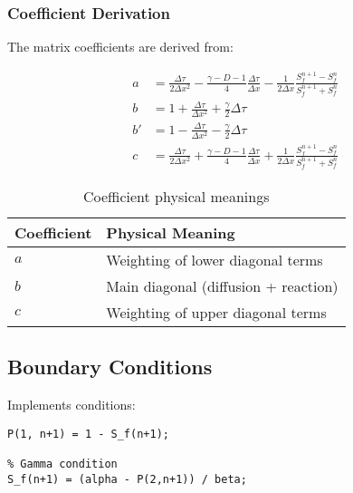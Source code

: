 \documentclass[12pt]{article}
\begin{document}
\subsubsection{Coefficient Derivation}
The matrix coefficients are derived from:

\begin{align*}
a &= \frac{\Delta\tau}{2\Delta x^2} - \frac{\gamma - D - 1}{4}\frac{\Delta\tau}{\Delta x} - \frac{1}{2\Delta x}\frac{S_f^{n+1} - S_f^n}{S_f^{n+1} + S_f^n} \\
b &= 1 + \frac{\Delta\tau}{\Delta x^2} + \frac{\gamma}{2}\Delta\tau \\
b' &= 1 - \frac{\Delta\tau}{\Delta x^2} - \frac{\gamma}{2}\Delta\tau \\
c &= \frac{\Delta\tau}{2\Delta x^2} + \frac{\gamma - D - 1}{4}\frac{\Delta\tau}{\Delta x} + \frac{1}{2\Delta x}\frac{S_f^{n+1} - S_f^n}{S_f^{n+1} + S_f^n}
\end{align*}

\begin{table}[h]
\centering
\caption{Coefficient physical meanings}
\begin{tabular}{ll}
\hline
Coefficient & Physical Meaning \\ \hline
$a$ & Weighting of lower diagonal terms \\
$b$ & Main diagonal (diffusion + reaction) \\
$c$ & Weighting of upper diagonal terms \\ \hline
\end{tabular}
\end{table}

\subsection{Boundary Conditions}
Implements conditions:
\begin{lstlisting}[caption={Boundary condition implementation}]
% Value-matching condition 
P(1, n+1) = 1 - S_f(n+1);

% Gamma condition 
S_f(n+1) = (alpha - P(2,n+1)) / beta;
\end{lstlisting}
\end{document}
